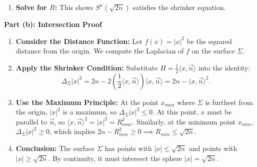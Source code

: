 \begin{solution}
\begin{enumerate}
    \item \textbf{Solve for $R$:}
    This shows $S^n(\sqrt{2n})$ satisfies the shrinker equation.
\end{enumerate}

\textbf{Part (b): Intersection Proof}
\begin{enumerate}
    \item \textbf{Consider the Distance Function:}
    Let $f(x) = |x|^2$ be the squared distance from the origin. We compute the Laplacian of $f$ on the surface $\Sigma$.
    
    \item \textbf{Apply the Shrinker Condition:}
    Substitute $H = \frac{1}{2} \langle x, \vec{n} \rangle$ into the identity:
    \[ \Delta_\Sigma |x|^2 = 2n - 2\left(\frac{1}{2} \langle x, \vec{n} \rangle\right) \langle x, \vec{n} \rangle = 2n - \langle x, \vec{n} \rangle^2. \]
    
    \item \textbf{Use the Maximum Principle:}
    At the point $x_{max}$ where $\Sigma$ is furthest from the origin, $|x|^2$ is a maximum, so $\Delta_\Sigma |x|^2 \leq 0$. At this point, $x$ must be parallel to $\vec{n}$, so $\langle x, \vec{n} \rangle^2 = |x|^2 = R_{max}^2$.
    Similarly, at the minimum point $x_{min}$, $\Delta_\Sigma |x|^2 \geq 0$, which implies $2n - R_{min}^2 \geq 0 \implies R_{min} \leq \sqrt{2n}$.
    
    \item \textbf{Conclusion:}
    The surface $\Sigma$ has points with $|x| \leq \sqrt{2n}$ and points with $|x| \geq \sqrt{2n}$. By continuity, it must intersect the sphere $|x| = \sqrt{2n}$.
\end{enumerate}
\end{solution}
